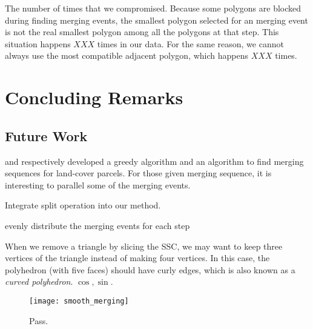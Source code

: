 \documentclass[ijgi,article,submit,moreauthors,pdftex]{Definitions/mdpi}
\begin{document}
The number of times that we compromised.
Because some polygons are blocked during finding merging events, 
the smallest polygon selected for an merging event 
is not the real smallest polygon 
among all the polygons at that step. 
This situation happens $XXX$ times in our data.
For the same reason, we cannot always use the most compatible adjacent polygon,
which happens $XXX$ times.












\section{Concluding Remarks}

\subsection{Future Work}

\citet{vanOosterom2005} and \citet[]{Peng2019Thesis}
respectively developed a greedy algorithm and an \Astar algorithm to find
merging sequences for land-cover parcels.
For those given merging sequence,
it is interesting to parallel some of the merging events.

Integrate split operation into our method.

evenly distribute the merging events for each step

When we remove a triangle by slicing the SSC, 
we may want to keep three vertices of the triangle 
instead of making four vertices.
In this case, the polyhedron (with five faces) should have curly edges,
which is also known as a \emph{curved polyhedron}.
$\cos, \sin$.



\begin{figure}[tb]
\centering
\texttt{[image: smooth\_merging]}
\caption{Pass.}
\label{fig:smooth_merging_future}
\end{figure}
\end{document}
